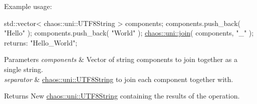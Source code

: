 Example usage\-:


\begin{DoxyCode}
std::vector< chaos::uni::UTF8String > components;
components.push\_back( \textcolor{stringliteral}{"Hello"} );
components.push\_back( \textcolor{stringliteral}{"World"} );
\hyperlink{namespacechaos_1_1uni_ad2a77983423c8b10e2b18cae6f35d329}{chaos::uni::join}( components, \textcolor{stringliteral}{"\_"} ); returns: \textcolor{stringliteral}{"Hello\_World"};
\end{DoxyCode}



\begin{DoxyParams}{Parameters}
{\em components} & Vector of string components to join together as a single string. \\
\hline
{\em separator} & \hyperlink{classchaos_1_1uni_1_1_u_t_f8_string}{chaos\-::uni\-::\-U\-T\-F8\-String} to join each component together with. \\
\hline
\end{DoxyParams}
\begin{DoxyReturn}{Returns}
New \hyperlink{classchaos_1_1uni_1_1_u_t_f8_string}{chaos\-::uni\-::\-U\-T\-F8\-String} containing the results of the operation. 
\end{DoxyReturn}
